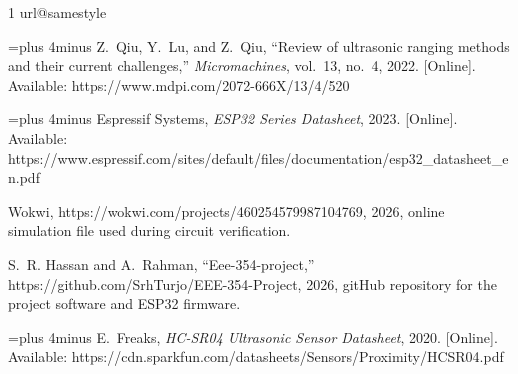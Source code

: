\documentclass[10pt, conference, compsocconf]{IEEEtran}
\begin{document}
\begin{thebibliography}{1}
\providecommand{\url}[1]{#1}
\csname url@samestyle\endcsname
\providecommand{\newblock}{\relax}
\providecommand{\bibinfo}[2]{#2}
\providecommand{\BIBentrySTDinterwordspacing}{\spaceskip=0pt\relax}
\providecommand{\BIBentryALTinterwordstretchfactor}{4}
\providecommand{\BIBentryALTinterwordspacing}{\spaceskip=\fontdimen2\font plus
\BIBentryALTinterwordstretchfactor\fontdimen3\font minus \fontdimen4\font\relax}
\providecommand{\BIBforeignlanguage}[2]{{%
\expandafter\ifx\csname l@#1\endcsname\relax
\typeout{** WARNING: IEEEtran.bst: No hyphenation pattern has been}%
\typeout{** loaded for the language `#1'. Using the pattern for}%
\typeout{** the default language instead.}%
\else
\language=\csname l@#1\endcsname
\fi
#2}}
\providecommand{\BIBdecl}{\relax}
\BIBdecl

\BIBentryALTinterwordspacing
Z.~Qiu, Y.~Lu, and Z.~Qiu, ``Review of ultrasonic ranging methods and their current challenges,'' \emph{Micromachines}, vol.~13, no.~4, 2022. [Online]. Available: \url{https://www.mdpi.com/2072-666X/13/4/520}
\BIBentrySTDinterwordspacing

\BIBentryALTinterwordspacing
{Espressif Systems}, \emph{ESP32 Series Datasheet}, 2023. [Online]. Available: \url{https://www.espressif.com/sites/default/files/documentation/esp32_datasheet_en.pdf}
\BIBentrySTDinterwordspacing

{Wokwi}, \url{https://wokwi.com/projects/460254579987104769}, 2026, online simulation file used during circuit verification.

S.~R. Hassan and A.~Rahman, ``Eee-354-project,'' \url{https://github.com/SrhTurjo/EEE-354-Project}, 2026, gitHub repository for the project software and ESP32 firmware.

\BIBentryALTinterwordspacing
E.~Freaks, \emph{HC-SR04 Ultrasonic Sensor Datasheet}, 2020. [Online]. Available: \url{https://cdn.sparkfun.com/datasheets/Sensors/Proximity/HCSR04.pdf}
\BIBentrySTDinterwordspacing

\end{thebibliography}
\end{document}
